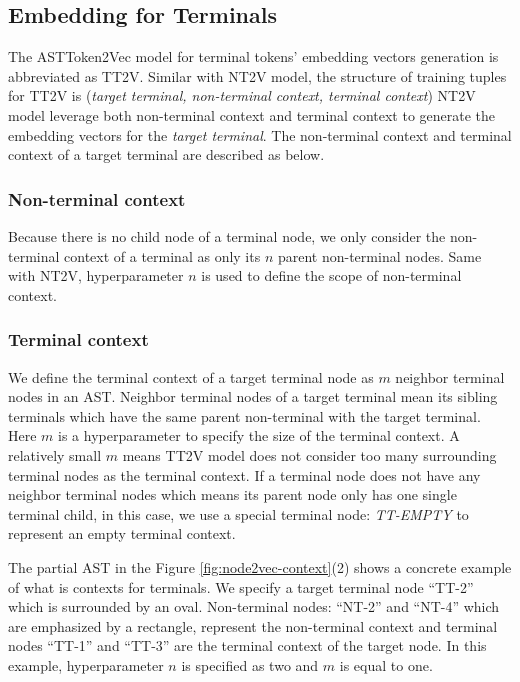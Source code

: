 \documentclass[T, E]{compsoft}
\begin{document}
\subsection{Embedding for Terminals}
\label{sub:embedding_tt}
The ASTToken2Vec model for terminal tokens' embedding vectors generation is abbreviated as TT2V.
Similar with NT2V model, the structure of training tuples for TT2V is (\textit{target terminal, non-terminal context, terminal context}) 
NT2V model leverage both non-terminal context and terminal context to generate the embedding vectors for the \textit{target terminal}.
The non-terminal context and terminal context of a target terminal are described as below.

\subsubsection{Non-terminal context} 
Because there is no child node of a terminal node, we only consider the non-terminal context of a terminal as only its $n$ parent non-terminal nodes. 
Same with NT2V, hyperparameter $n$ is used to define the scope of non-terminal context.

\subsubsection{Terminal context} 
We define the terminal context of a target terminal node as $m$ neighbor terminal nodes in an AST. 
Neighbor terminal nodes of a target terminal mean its sibling terminals which have the same parent non-terminal with the target terminal.
Here $m$ is a hyperparameter to specify the size of the terminal context. 
A relatively small $m$ means TT2V model does not consider too many surrounding terminal nodes as the terminal context. 
If a terminal node does not have any neighbor terminal nodes which means its parent node only has one single terminal child, in this case, we use a special terminal node: \textit{TT-EMPTY} to represent an empty terminal context. 

The partial AST in the Figure \ref{fig:node2vec-context}(2) shows a concrete example of what is contexts for terminals.
We specify a target terminal node ``TT-2'' which is surrounded by an oval. 
Non-terminal nodes: ``NT-2'' and ``NT-4'' which are emphasized by a rectangle, represent the non-terminal context and terminal nodes ``TT-1'' and ``TT-3'' are the terminal context of the target node. 
In this example, hyperparameter $n$ is specified as two and $m$ is equal to one.
\end{document}
